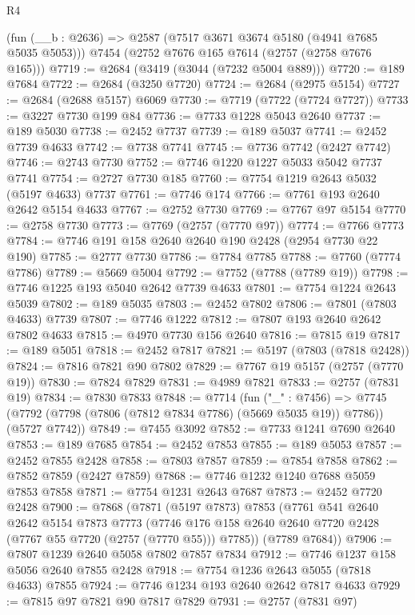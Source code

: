 \begin{lexlean}{R4}
\begin{coremodule}
    (fun (__b : @2636) => @2587 (@7517 @3671 @3674 @5180 (@4941 @7685 @5035 @5053)))
    @7454
    (@2752 @7676 @165 @7614 (@2757 (@2758 @7676 @165)))
@7719 := @2684 (@3419 (@3044 (@7232 @5004 @889)))
@7720 := @189 @7684
@7722 := @2684 (@3250 @7720)
@7724 := @2684 (@2975 @5154)
@7727 := @2684 (@2688 @5157) @6069
@7730 := @7719 (@7722 (@7724 @7727))
@7733 := @3227 @7730 @199 @84
@7736 := @7733 @1228 @5043 @2640
@7737 := @189 @5030
@7738 := @2452 @7737
@7739 := @189 @5037
@7741 := @2452 @7739 @4633
@7742 := @7738 @7741
@7745 := @7736 @7742 (@2427 @7742)
@7746 := @2743 @7730
@7752 := @7746 @1220 @1227 @5033 @5042 @7737 @7741
@7754 := @2727 @7730 @185
@7760 := @7754 @1219 @2643 @5032 (@5197 @4633) @7737
@7761 := @7746 @174
@7766 := @7761 @193 @2640 @2642 @5154 @4633
@7767 := @2752 @7730
@7769 := @7767 @97 @5154
@7770 := @2758 @7730
@7773 := @7769 (@2757 (@7770 @97))
@7774 := @7766 @7773
@7784 := @7746 @191 @158 @2640 @2640 @190 @2428 (@2954 @7730 @22 @190)
@7785 := @2777 @7730
@7786 := @7784 @7785
@7788 := @7760 (@7774 @7786)
@7789 := @5669 @5004
@7792 := @7752 (@7788 (@7789 @19))
@7798 := @7746 @1225 @193 @5040 @2642 @7739 @4633
@7801 := @7754 @1224 @2643 @5039
@7802 := @189 @5035
@7803 := @2452 @7802
@7806 := @7801 (@7803 @4633) @7739
@7807 := @7746 @1222
@7812 := @7807 @193 @2640 @2642 @7802 @4633
@7815 := @4970 @7730 @156 @2640
@7816 := @7815 @19
@7817 := @189 @5051
@7818 := @2452 @7817
@7821 := @5197 (@7803 (@7818 @2428))
@7824 := @7816 @7821 @90 @7802
@7829 := @7767 @19 @5157 (@2757 (@7770 @19))
@7830 := @7824 @7829
@7831 := @4989 @7821
@7833 := @2757 (@7831 @19)
@7834 := @7830 @7833
@7848 := @7714
    (fun ("_" : @7456) =>
    @7745 (@7792 (@7798 (@7806 (@7812 @7834 @7786) (@5669 @5035 @19)) @7786)) (@5727 @7742))
@7849 := @7455 @3092
@7852 := @7733 @1241 @7690 @2640
@7853 := @189 @7685
@7854 := @2452 @7853
@7855 := @189 @5053
@7857 := @2452 @7855 @2428
@7858 := @7803 @7857
@7859 := @7854 @7858
@7862 := @7852 @7859 (@2427 @7859)
@7868 := @7746 @1232 @1240 @7688 @5059 @7853 @7858
@7871 := @7754 @1231 @2643 @7687
@7873 := @2452 @7720 @2428
@7900 := @7868
    (@7871
      (@5197 @7873)
      @7853
      (@7761
        @541
        @2640
        @2642
        @5154
        @7873
        @7773
        (@7746 @176 @158 @2640 @2640 @7720 @2428 (@7767 @55 @7720 (@2757 (@7770 @55))) @7785))
      (@7789 @7684))
@7906 := @7807 @1239 @2640 @5058 @7802 @7857 @7834
@7912 := @7746 @1237 @158 @5056 @2640 @7855 @2428
@7918 := @7754 @1236 @2643 @5055 (@7818 @4633) @7855
@7924 := @7746 @1234 @193 @2640 @2642 @7817 @4633
@7929 := @7815 @97 @7821 @90 @7817 @7829
@7931 := @2757 (@7831 @97)

\end{coremodule}
\end{lexlean}
